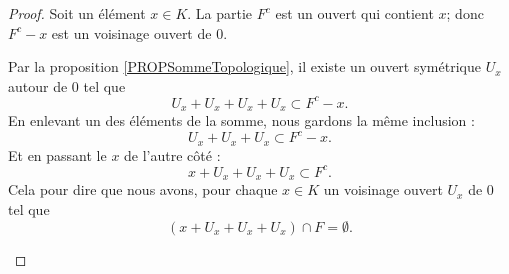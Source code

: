 \begin{proof}
	Soit un élément \( x\in K\). La partie \( F^c\) est un ouvert qui contient \( x\); donc \( F^c-x\) est un voisinage ouvert de \( 0\).

	\begin{subproof}
		Par la proposition \ref{PROPSommeTopologique}, il existe un ouvert symétrique \( U_x\) autour de \( 0\) tel que
		\begin{equation}
			U_x+U_x+U_x+U_x\subset F^c-x.
		\end{equation}
		En enlevant un des éléments de la somme, nous gardons la même inclusion :
		\begin{equation}
			U_x+U_x+U_x\subset F^c-x.
		\end{equation}
		Et en passant le \( x\) de l'autre côté :
		\begin{equation}
			x+U_x+U_x+U_x\subset F^c.
		\end{equation}
		Cela pour dire que nous avons, pour chaque \( x\in K\) un voisinage ouvert \( U_x\) de \( 0\) tel que
		\begin{equation}        \label{EQooPXUVooVvUEoN}
			(x+U_x+U_x+U_x)\cap F=\emptyset.
		\end{equation}


\end{subproof}
\end{proof}
